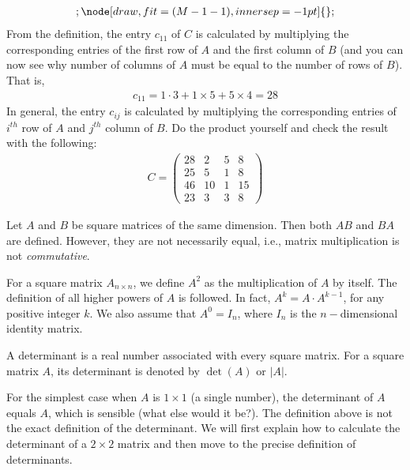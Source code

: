 \begin{example}
\begin{align*}
{{{							};
							\node[draw,fit=(M-1-1),inner sep=-1pt] {};
					}}
				\end{align*}
			From the definition, the entry $c_{11}$ of $C$ is calculated by multiplying the corresponding entries of the first row of $A$ and the first column of $B$ (and you can now see why number of columns of $A$ must be equal to the number of rows of $B$). That is,
				\begin{align*}
					c_{11}=1 \cdot 3 + 1 \times 5 + 5 \times 4 = 28
				\end{align*}
			In general, the entry $c_{ij}$ is calculated by multiplying the corresponding entries of $i^{th}$ row of $A$ and $j^{th}$ column of $B$. Do the product yourself and check the result with the following:
			\begin{align*}
			C = \begin{pmatrix}
				{28}&2&5&8\\
				{25}&5&1&8\\
				{46}&{10}&1&{15}\\
				{23}&3&3&8
				\end{pmatrix}
			\end{align*}
	\end{example}

	\begin{note}
		Let $A$ and $B$ be square matrices of the same dimension. Then both $AB$ and $BA$ are defined. However, they are not necessarily equal, i.e., matrix multiplication is not \textit{commutative}.
	\end{note}


	\begin{definition}
		For a square matrix $A_{n\times n}$, we define $A^2$ as the multiplication of $A$ by itself. The definition of all higher powers of $A$ is followed. In fact, $A^k=A \cdot A^{k-1}$, for any positive integer $k$. We also assume that $A^{0}=I_n$, where $I_n$ is the $n-$dimensional identity matrix.
	\end{definition}

	\begin{definition}
		A determinant is a real number associated with every square matrix. For a square matrix $A$, its determinant is denoted by $\det(A)$ or $|A|$.
	\end{definition}

For the simplest case when $A$ is $1\times 1$ (a single number), the determinant of $A$ equals $A$, which is sensible (what else would it be?). The definition above is not the exact definition of the determinant. We will first explain how to calculate the determinant of a $2\times 2$ matrix and then move to the precise definition of determinants.

